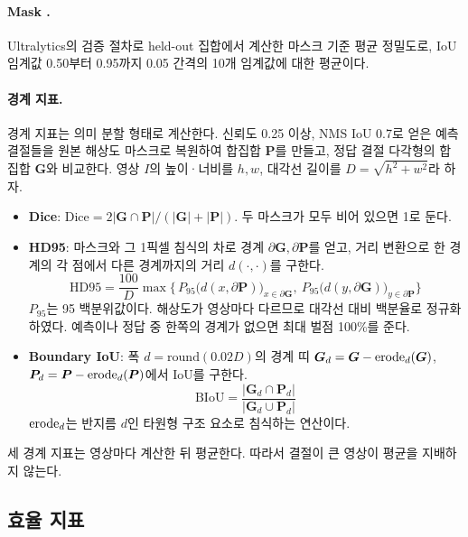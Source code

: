 \paragraph{Mask \mAP{}.} Ultralytics의 검증 절차로 held-out 집합에서 계산한 마스크 기준 평균 정밀도로,
IoU 임계값 0.50부터 0.95까지 0.05 간격의 10개 임계값에 대한 평균이다.

\paragraph{경계 지표.} 경계 지표는 의미 분할 형태로 계산한다. 신뢰도 0.25 이상, NMS IoU 0.7로 얻은 예측
결절들을 원본 해상도 마스크로 복원하여 합집합 $\bm{P}$를 만들고, 정답 결절 다각형의 합집합 $\bm{G}$와 비교한다.
영상 $I$의 높이·너비를 $h, w$, 대각선 길이를 $D=\sqrt{h^2+w^2}$라 하자.

\begin{itemize}
  \item \textbf{Dice}: $\mathrm{Dice} = 2|\bm{G}\cap\bm{P}| / (|\bm{G}|+|\bm{P}|)$. 두 마스크가 모두 비어 있으면 1로 둔다.
  \item \textbf{HD95}: 마스크와 그 1픽셀 침식의 차로 경계 $\partial\bm{G}, \partial\bm{P}$를 얻고, 거리 변환으로
    한 경계의 각 점에서 다른 경계까지의 거리 $d(\cdot,\cdot)$를 구한다.
    \begin{equation}
      \mathrm{HD95} = \frac{100}{D}\max\Big\{\, P_{95}\big(d(x,\partial\bm{P})\big)_{x\in\partial\bm{G}},\
      P_{95}\big(d(y,\partial\bm{G})\big)_{y\in\partial\bm{P}} \Big\}
      \label{eq:hd95}
    \end{equation}
    $P_{95}$는 95 백분위값이다. 해상도가 영상마다 다르므로 대각선 대비 백분율로 정규화하였다. 예측이나 정답 중
    한쪽의 경계가 없으면 최대 벌점 100\%를 준다.
  \item \textbf{Boundary IoU}\citep{cheng2021boundaryiou}: 폭 $d=\mathrm{round}(0.02D)$의 경계 띠
    $\bm{G}_d = \bm{G} - \operatorname{erode}_d(\bm{G})$, $\bm{P}_d = \bm{P} - \operatorname{erode}_d(\bm{P})$에서 IoU를 구한다.
    \begin{equation}
      \mathrm{BIoU} = \frac{|\bm{G}_d\cap\bm{P}_d|}{|\bm{G}_d\cup\bm{P}_d|}
      \label{eq:biou}
    \end{equation}
    $\operatorname{erode}_d$는 반지름 $d$인 타원형 구조 요소로 침식하는 연산이다.
\end{itemize}

세 경계 지표는 영상마다 계산한 뒤 평균한다. 따라서 결절이 큰 영상이 평균을 지배하지 않는다.

\subsection{효율 지표}

